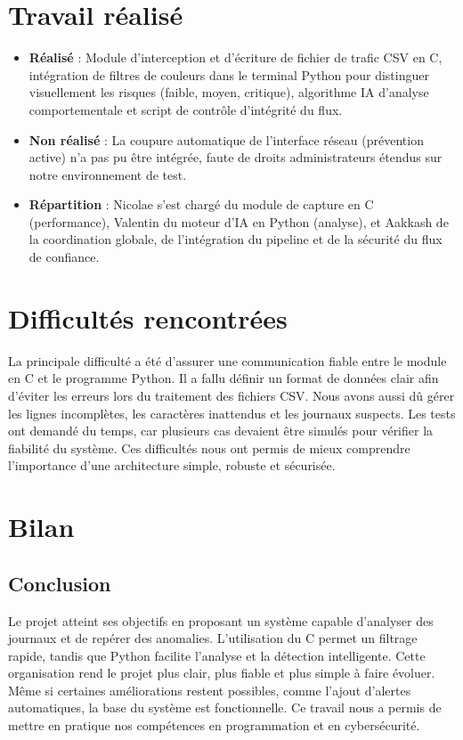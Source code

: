\documentclass[a4paper, 12pt, twoside]{article}
\begin{document}
\section{Travail réalisé}
\begin{itemize}
    \item \textbf{Réalisé} : Module d'interception et d'écriture de fichier de trafic CSV en C, intégration de filtres de couleurs dans le terminal Python pour distinguer visuellement les risques (faible, moyen, critique), algorithme IA d'analyse comportementale et script de contrôle d'intégrité du flux.
    \item \textbf{Non réalisé} : La coupure automatique de l'interface réseau (prévention active) n'a pas pu être intégrée, faute de droits administrateurs étendus sur notre environnement de test.
    \item \textbf{Répartition} : Nicolae s'est chargé du module de capture en C (performance), Valentin du moteur d'IA en Python (analyse), et Aakkash de la coordination globale, de l'intégration du pipeline et de la sécurité du flux de confiance.
\end{itemize}

\section{Difficultés rencontrées}
La principale difficulté a été  d’assurer une communication fiable entre le module en
C et le programme Python. Il a fallu définir un format de données clair afin d’éviter
les erreurs lors du traitement des fichiers CSV. Nous avons aussi dû gérer les lignes
incomplètes, les caractères inattendus et les journaux suspects. Les tests ont demandé
du temps, car plusieurs cas devaient être simulés pour vérifier la fiabilité du système.
Ces difficultés nous ont permis de mieux comprendre l’importance d’une architecture
simple, robuste et sécurisée.

\section{Bilan}
\subsection{Conclusion}
Le projet atteint ses objectifs en proposant un système capable d’analyser des journaux et de repérer des anomalies. L’utilisation du C permet un filtrage rapide, tandis
que Python facilite l’analyse et la détection intelligente. Cette organisation rend le projet plus clair, plus fiable et plus simple à faire évoluer. Même si certaines améliorations restent possibles, comme l’ajout d’alertes automatiques, la base du système est fonctionnelle. Ce travail nous a permis de mettre en pratique nos compétences en programmation et en cybersécurité.
\end{document}
